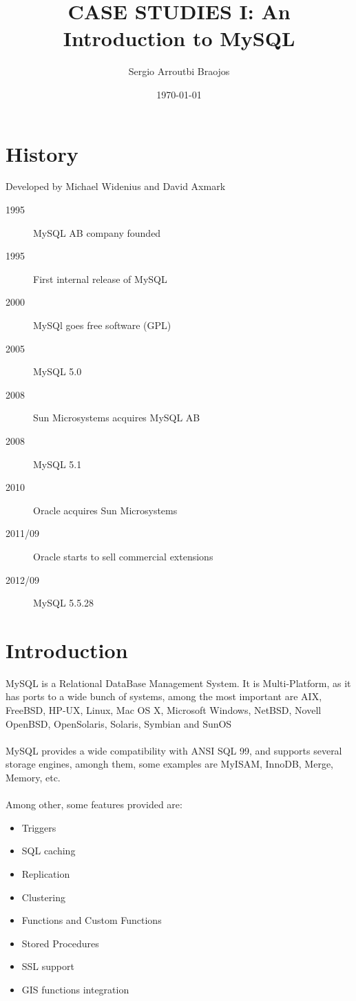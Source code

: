 \documentclass[11pt]{article}
\title{\textbf{CASE STUDIES I: An Introduction to MySQL}}
\author{Sergio Arroutbi Braojos}
\date{\today}
\begin{document}
\maketitle

\section{History}
Developed by Michael Widenius and David Axmark\begin{description}
\item[1995] MySQL AB company founded
\item[1995] First internal release of MySQL
\item[2000] MySQl goes free software (GPL)
\item[2005] MySQL 5.0
\item[2008] Sun Microsystems acquires MySQL AB
\item[2008] MySQL 5.1
\item[2010] Oracle acquires Sun Microsystems
\item[2011/09] Oracle starts to sell commercial extensions
\item[2012/09] MySQL 5.5.28
\end{description}

\section{Introduction}
MySQL is a Relational DataBase Management System. It is Multi-Platform, as it has ports to a wide bunch of systems, among the most important are  AIX, FreeBSD, HP-UX, Linux, Mac OS X, Microsoft Windows, NetBSD, Novell OpenBSD, OpenSolaris, Solaris, Symbian and SunOS\\
\\
MySQL provides a wide compatibility with ANSI SQL 99, and supports several storage engines, amongh them, some examples are MyISAM, InnoDB, Merge, Memory, etc.\\
\\
Among other, some features provided are:
\begin{itemize}
\item Triggers
\item SQL caching
\item Replication
\item Clustering 
\item Functions and Custom Functions
\item Stored Procedures
\item SSL support
\item GIS functions integration
\end{itemize}
\end{document}
